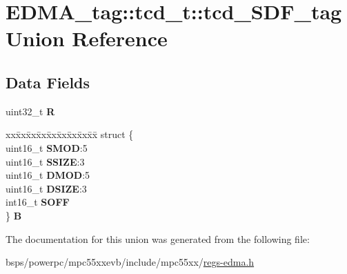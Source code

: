\hypertarget{unionEDMA__tag_1_1tcd__t_1_1tcd__SDF__tag}{}\section{E\+D\+M\+A\+\_\+tag\+::tcd\+\_\+t\+::tcd\+\_\+\+S\+D\+F\+\_\+tag Union Reference}
\label{unionEDMA__tag_1_1tcd__t_1_1tcd__SDF__tag}
\subsection*{Data Fields}
\begin{DoxyCompactItemize}
\item 
\mbox{\label{unionEDMA__tag_1_1tcd__t_1_1tcd__SDF__tag_afc10bbd05cc5d0365eab4a5c1c5ac886}} 
uint32\+\_\+t {\bfseries R}
\item 
\mbox{\label{unionEDMA__tag_1_1tcd__t_1_1tcd__SDF__tag_a66b9641eef681a51d1dc86728de0c3c0}} 
\begin{tabbing}
xx\=xx\=xx\=xx\=xx\=xx\=xx\=xx\=xx\=\kill
struct \{\\
\>uint16\_t {\bfseries SMOD}:5\\
\>uint16\_t {\bfseries SSIZE}:3\\
\>uint16\_t {\bfseries DMOD}:5\\
\>uint16\_t {\bfseries DSIZE}:3\\
\>int16\_t {\bfseries SOFF}\\
\} {\bfseries B}\\

\end{tabbing}\end{DoxyCompactItemize}


The documentation for this union was generated from the following file\+:\begin{DoxyCompactItemize}
\item 
bsps/powerpc/mpc55xxevb/include/mpc55xx/\mbox{\hyperlink{regs-edma_8h}{regs-\/edma.\+h}}\end{DoxyCompactItemize}
